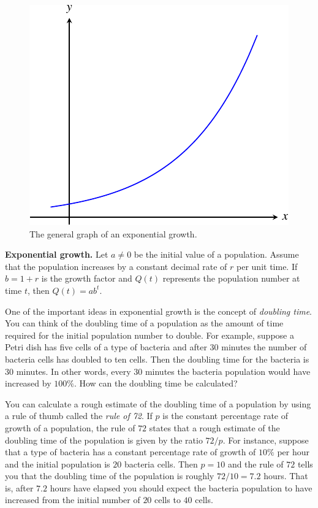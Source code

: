 \documentclass[a4paper,oneside,12pt]{article}
\begin{document}
\begin{figure}[!htbp]
\centering
\includegraphics[scale=1.1]{image/11/exponential-growth.pdf}
\caption{%
  The general graph of an exponential growth.
}
\label{fig:general_exponential_growth}
\end{figure}

\begin{theorem}
\label{thm:exponential_growth}
\textbf{Exponential growth.}
Let $a \neq 0$ be the initial value of a population.  Assume that the
population increases by a constant decimal rate of $r$ per unit time.
If $b = 1 + r$ is the growth factor and $Q(t)$ represents the
population number at time $t$, then $Q(t) = ab^t$.
\end{theorem}

One of the important ideas in exponential growth is the concept of
\emph{doubling time}.  You can think of the doubling time of a
population as the amount of time required for the initial population
number to double.  For example, suppose a Petri dish has five cells of
a type of bacteria and after $30$ minutes the number of bacteria cells
has doubled to ten cells.  Then the doubling time for the bacteria is
$30$ minutes.  In other words, every $30$ minutes the bacteria
population would have increased by $100\%$.  How can the doubling time
be calculated?

You can calculate a rough estimate of the doubling time of a
population by using a rule of thumb called the \emph{rule of 72}.  If
$p$ is the constant percentage rate of growth of a population, the
rule of $72$ states that a rough estimate of the doubling time of the
population is given by the ratio $72 / p$.  For instance, suppose that
a type of bacteria has a constant percentage rate of growth of $10\%$ per
hour and the initial population is $20$ bacteria cells.  Then $p = 10$
and the rule of $72$ tells you that the doubling time of the
population is roughly $72 / 10 = 7.2$ hours.  That is, after $7.2$
hours have elapsed you should expect the bacteria population to have
increased from the initial number of $20$ cells to $40$ cells.
\end{document}
